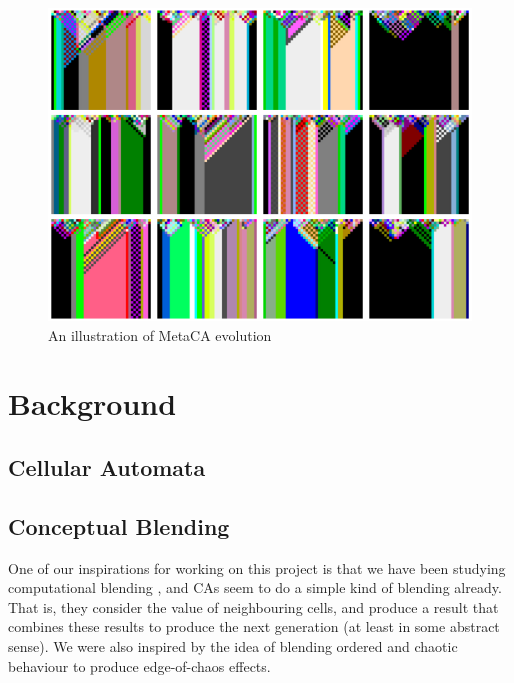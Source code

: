 \documentclass{AISB2008}
\begin{document}
\begin{figure}
\includegraphics[width=\columnwidth]{metaca.png}
\caption{An illustration of MetaCA evolution\label{metaca-taster}}
\end{figure}

\newpage

\section{Background}

\subsection{Cellular Automata}



\subsection{Conceptual Blending}

One of our inspirations for working on this project is that we have
been studying computational blending \cite{}, and CAs seem to do a
simple kind of blending already.  That is, they consider the value of
neighbouring cells, and produce a result that combines these results
to produce the next generation (at least in some abstract sense).  We
were also inspired by the idea of blending ordered and chaotic
behaviour to produce edge-of-chaos effects.
\end{document}
